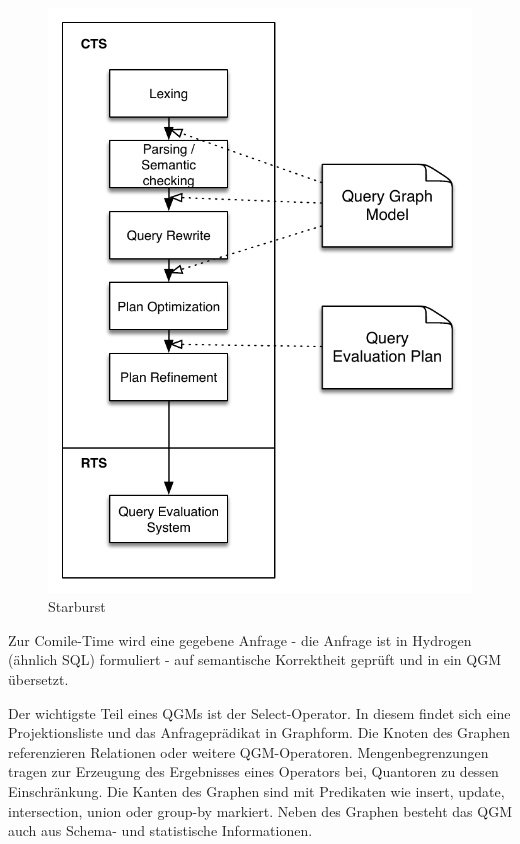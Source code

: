 \begin{figure}[ht]
  \centering
  \includegraphics{03_Related_Work/StarburstFlow.pdf}
  \caption{Starburst}
  \label{StarburstFlow}
\end{figure}

Zur Comile-Time wird eine gegebene Anfrage - die Anfrage ist in Hydrogen (ähnlich SQL) formuliert - auf semantische Korrektheit geprüft und in ein \ac{QGM} übersetzt.

Der wichtigste Teil eines \ac{QGM}s ist der Select-Operator. In diesem findet sich eine Projektionsliste und das Anfrageprädikat in Graphform. Die Knoten des Graphen referenzieren Relationen oder weitere \ac{QGM}-Operatoren. Mengenbegrenzungen tragen zur Erzeugung des Ergebnisses eines Operators bei, Quantoren zu dessen Einschränkung. Die Kanten des Graphen sind mit Predikaten wie insert, update, intersection, union oder group-by markiert. Neben des Graphen besteht das \ac{QGM} auch aus Schema- und statistische Informationen. 

